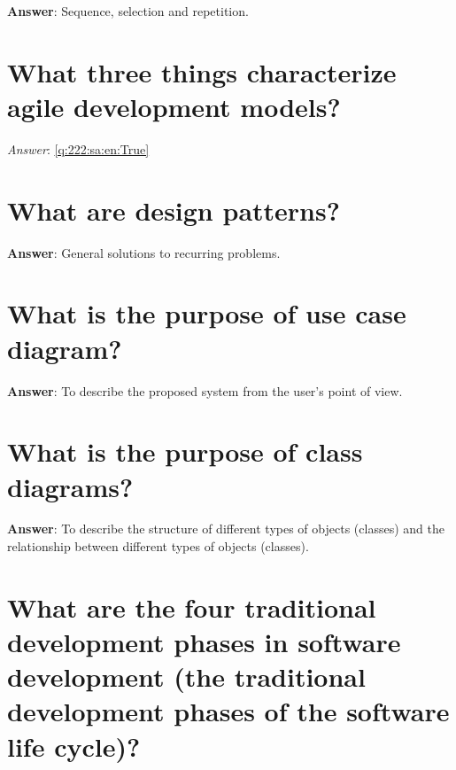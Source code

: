 \documentclass[a4paper,11pt,oneside]{book}
\begin{document}
\begin{sloppypar}
\label{q:221:sa:en:True}

\textbf{Answer}: Sequence, selection and repetition.



\section{What three things characterize agile development models?}

\label{q:222:sa:en:True}

\vspace{2cm}

\noindent\makebox[\textwidth]{\hrulefill}

\vspace{1cm}

\textit{Answer}: \autoref{q:222:sa:en:True}



\section{What are design patterns?}

\label{q:223:sa:en:True}

\textbf{Answer}: General solutions to recurring problems.



\section{What is the purpose of use case diagram?}

\label{q:224:sa:en:True}

\textbf{Answer}: To describe the proposed system from the user's point of view.



\section{What is the purpose of class diagrams?}

\label{q:225:sa:en:True}

\textbf{Answer}: To describe the structure of different types of objects (classes) and the relationship between different types of objects (classes).



\section{What are the four traditional development phases in software development (the traditional development phases of the software life cycle)?}


\end{sloppypar}
\end{document}
